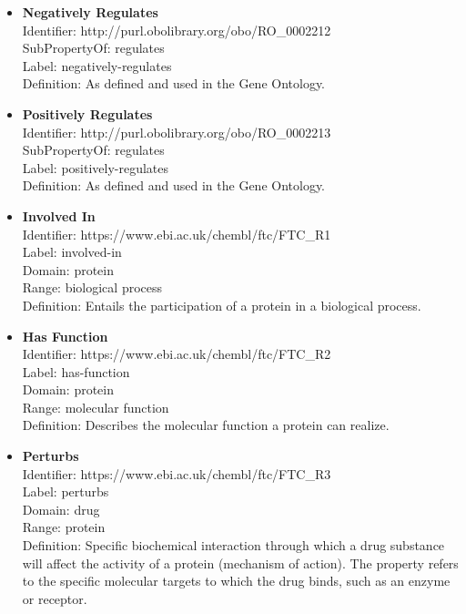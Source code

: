 \documentclass{bioinfo}
\begin{document}
\begin{itemize}
\item \textbf{Negatively Regulates} \\
Identifier: http://purl.obolibrary.org/obo/RO\_0002212 \\
SubPropertyOf: regulates \\
Label: negatively-regulates \\
Definition: As defined and used in the Gene Ontology.
\end{itemize}

\begin{itemize}
\item \textbf{Positively Regulates} \\
Identifier: http://purl.obolibrary.org/obo/RO\_0002213 \\
SubPropertyOf: regulates \\
Label: positively-regulates \\
Definition: As defined and used in the Gene Ontology.
\end{itemize}

\begin{itemize}
\item \textbf{Involved In} \\
Identifier: https://www.ebi.ac.uk/chembl/ftc/FTC\_R1 \\
Label: involved-in \\
Domain: protein \\
Range: biological process \\
Definition: Entails the participation of a protein in a biological process. \\
\end{itemize}

\begin{itemize}
\item \textbf{Has Function} \\
Identifier: https://www.ebi.ac.uk/chembl/ftc/FTC\_R2 \\
Label: has-function \\
Domain: protein \\
Range: molecular function \\
Definition: Describes the molecular function a protein can realize. \\
\end{itemize}

\begin{itemize}
\item \textbf{Perturbs} \\
Identifier: https://www.ebi.ac.uk/chembl/ftc/FTC\_R3 \\
Label: perturbs \\
Domain: drug \\
Range: protein \\
Definition: Specific biochemical interaction through which a drug substance 
will affect the activity of a protein (mechanism of action). The property refers to the specific molecular 
targets to which the drug binds, such as an enzyme or receptor.
\end{itemize}
\end{document}
